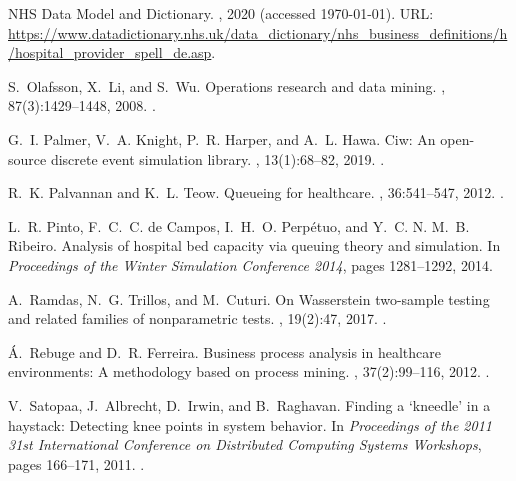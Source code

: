 \documentclass[11pt]{article}
\begin{document}
\begin{thebibliography}{10}
{NHS Data Model and Dictionary}.
, 2020 (accessed
  \today).
\newblock URL:
  \url{https://www.datadictionary.nhs.uk/data_dictionary/nhs_business_definitions/h/hospital_provider_spell_de.asp}.

S.~Olafsson, X.~Li, and S.~Wu.
\newblock Operations research and data mining.
, 87(3):1429--1448,
  2008.
\newblock \href {https://doi.org/https://doi.org/10.1016/j.ejor.2006.09.023}
  {}.

G.~I. Palmer, V.~A. Knight, P.~R. Harper, and A.~L. Hawa.
\newblock Ciw: An open-source discrete event simulation library.
, 13(1):68--82, 2019.
\newblock \href {https://doi.org/10.1080/17477778.2018.1473909}
  {}.

R.~K. Palvannan and K.~L. Teow.
\newblock Queueing for healthcare.
, 36:541--547, 2012.
\newblock \href {https://doi.org/10.1007/s10916-010-9499-7}
  {}.

L.~R. {Pinto}, F.~C.~C. {de Campos}, I.~H.~O. {Perp\'{e}tuo}, and Y.~C. N.
  M.~B. {Ribeiro}.
\newblock Analysis of hospital bed capacity via queuing theory and simulation.
\newblock In {\em Proceedings of the Winter Simulation Conference 2014}, pages
  1281--1292, 2014.

A.~Ramdas, N.~G. Trillos, and M.~Cuturi.
\newblock On {W}asserstein two-sample testing and related families of
  nonparametric tests.
, 19(2):47, 2017.
\newblock \href {https://doi.org/10.3390/e19020047}
  {}.

{\'A}.~Rebuge and D.~R. Ferreira.
\newblock Business process analysis in healthcare environments: A methodology
  based on process mining.
, 37(2):99--116, 2012.
\newblock \href {https://doi.org/10.1016/j.is.2011.01.003}
  {}.

V.~Satopaa, J.~Albrecht, D.~Irwin, and B.~Raghavan.
\newblock Finding a `kneedle' in a haystack: Detecting knee points in system
  behavior.
\newblock In {\em Proceedings of the 2011 31st International Conference on
  Distributed Computing Systems Workshops}, pages 166--171, 2011.
\newblock \href {https://doi.org/10.1109/ICDCSW.2011.20}
  {}.


\end{thebibliography}
\end{document}
